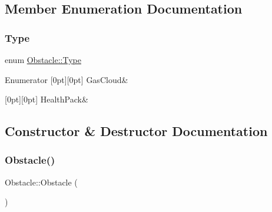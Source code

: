 \subsection{Member Enumeration Documentation}
\mbox{\label{class_obstacle_aef5f840b29b95afb87fb27883d89f5fa}} 
\subsubsection{\texorpdfstring{Type}{Type}}
{\footnotesize\ttfamily enum \hyperlink{class_obstacle_aef5f840b29b95afb87fb27883d89f5fa}{Obstacle\+::\+Type}}

\begin{DoxyEnumFields}{Enumerator}
[0pt][0pt]{}\mbox{\label{class_obstacle_aef5f840b29b95afb87fb27883d89f5faad988b9af015231c41987f68cd184c15c}} 
Gas\+Cloud&\\
\hline

[0pt][0pt]{}\mbox{\label{class_obstacle_aef5f840b29b95afb87fb27883d89f5faa3af525a9e6a9d6ef664dfc9a7080f2de}} 
Health\+Pack&\\
\hline

\end{DoxyEnumFields}


\subsection{Constructor \& Destructor Documentation}
\mbox{\label{class_obstacle_a8f734072321fa06a7b7dae2d5f50f352}} 
\subsubsection{\texorpdfstring{Obstacle()}{Obstacle()}}
{\footnotesize\ttfamily Obstacle\+::\+Obstacle (\begin{DoxyParamCaption}{ }\end{DoxyParamCaption})}

